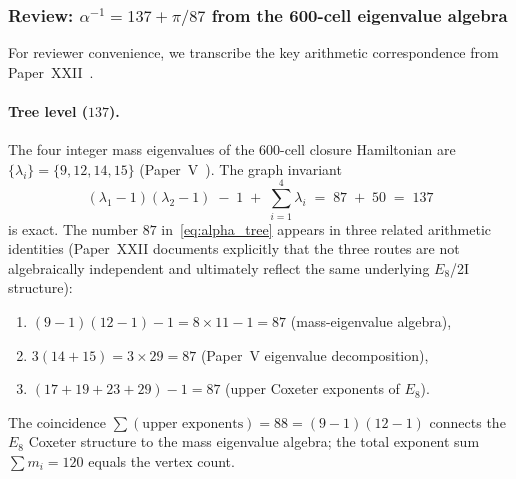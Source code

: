 \documentclass[12pt]{article}
\begin{document}
\subsubsection*{Review: $\alpha^{-1} = 137 + \pi/87$ from the 600-cell
eigenvalue algebra}

For reviewer convenience, we transcribe the key arithmetic correspondence from
Paper~XXII~\citep{SmartXXII}.

\paragraph{Tree level ($137$).}
The four integer mass eigenvalues of the 600-cell closure Hamiltonian
are $\{\lambda_i\} = \{9,12,14,15\}$ (Paper~V~\citep{SmartV}). The
graph invariant
\begin{equation}\label{eq:alpha_tree}
    (\lambda_1 - 1)(\lambda_2 - 1) \;-\; 1 \;+\; \sum_{i=1}^4 \lambda_i
    \;=\; 87 \;+\; 50 \;=\; 137
\end{equation}
is exact. The number $87$ in~\eqref{eq:alpha_tree} appears in three related arithmetic identities (Paper~XXII documents explicitly that the three routes are not algebraically independent and ultimately reflect the same underlying $E_8$/2I structure):
\begin{enumerate}
    \item $(9-1)(12-1) - 1 = 8 \times 11 - 1 = 87$ \qquad (mass-eigenvalue algebra),
    \item $3(14+15) = 3 \times 29 = 87$ \qquad (Paper~V eigenvalue decomposition),
    \item $(17+19+23+29) - 1 = 87$ \qquad (upper Coxeter exponents of $E_8$).
\end{enumerate}
The coincidence $\sum(\text{upper exponents}) = 88 = (9-1)(12-1)$
connects the $E_8$ Coxeter structure to the mass eigenvalue algebra;
the total exponent sum $\sum m_i = 120$ equals the vertex count.
\end{document}
